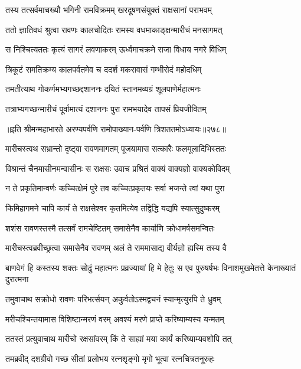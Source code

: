 \twolineshloka
{तस्य तत्सर्वमाचख्यौ भगिनी रामविक्रमम्}
{खरदूषणसंयुक्तं राक्षसानां पराभवम्}


\twolineshloka
{ततो ज्ञातिवधं श्रुत्वा रावणः कालचोदितः}
{रामस्य वधमाकाङ्क्षन्मारीचं मनसागमत्}


\twolineshloka
{स निश्चित्यततः कृत्यं सागरं लवणाकरम्}
{ऊर्ध्वमाचक्रमे राजा विधाय नगरे विधिम्}


\twolineshloka
{त्रिकूटं समतिक्रम्य कालपर्वतमेव च}
{ददर्श मकरावासं गम्भीरोदं महोदधिम्}


\twolineshloka
{तमतीत्याथ गोकर्णमभ्यगच्छद्दशाननः}
{दयितं स्तानमव्यग्रं शूलपाणेर्महात्मनः}


\twolineshloka
{तत्राभ्यगच्छन्मारीचं पूर्वामात्यं दशाननः}
{पुरा रामभयादेव तापसं प्रियजीवितम्}


॥इति श्रीमन्महाभारते अरण्यपर्वणि रामोपाख्यान-पर्वणि त्रिशततमोऽध्यायः॥२७८॥

\storymeta

\resetShloka



\twolineshloka
{मारीचस्त्वथ सभ्रान्तो दृष्ट्वा रावणमागतम्}
{पूजयामास सत्कारैः फलमूलादिभिस्ततः}


\twolineshloka
{विश्रान्तं चैनमासीनमन्वासीनः स राक्षसः}
{उवाच प्रश्रितं वाक्यं वाक्यज्ञो वाक्यकोविदम्}


\twolineshloka
{न ते प्रकृतिमान्वर्णः कच्चित्क्षेमं पुरे तव}
{कच्चित्प्रकृतयः सर्वा भजन्ते त्वां यथा पुरा}


\twolineshloka
{किमिहागमने चापि कार्यं ते राक्षसेश्वर}
{कृतमित्येव तद्विद्धि यद्यपि स्यात्सुदुष्करम्}


\twolineshloka
{शशंस रावणस्तस्मै तत्सर्वं रामचेष्टितम्}
{समासेनैव कार्याणि क्रोधामर्षसमन्वितः}


\twolineshloka
{मारीचस्त्वब्रवीच्छ्रत्वा समासेनैव रावणम्}
{अलं ते राममासाद्य वीर्यज्ञो ह्यस्मि तस्य वै}


\threelineshloka
{बाणवेगं हि कस्तस्य शक्तः सोढुं महात्मनः}
{प्रव्रज्यायां हि मे हेतुः स एव पुरुषर्षभः}
{विनाशमुखमेतत्ते केनाख्यातं दुरात्मना}


\twolineshloka
{तमुवाचाथ सक्रोधो रावणः परिभर्त्सयन्}
{अकुर्वतोऽस्मद्वचनं स्यान्मृत्युरपि ते ध्रुवम्}


\twolineshloka
{मरीचश्चिन्तयामास विशिष्टान्मरणं वरम्}
{अवश्यं मरणे प्राप्ते करिष्याम्यस्य यन्मतम्}


\twolineshloka
{ततस्तं प्रत्युवाचाथ मारीचो रक्षसांवरम्}
{किं ते साह्यां मया कार्यं करिष्याम्यवशोपि तत्}


\twolineshloka
{तमब्रवीद् दशग्रीवो गच्छ सीतां प्रलोभय}
{रत्नशृङ्गो मृगो भूत्वा रत्नचित्रतनूरुहः}


